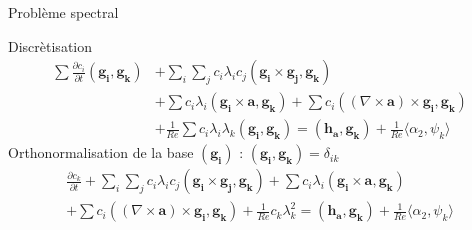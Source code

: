 \documentclass{beamer}
\newcommand{\rot}{{\nabla\times}}
\begin{document}
\begin{frame}{Problème spectral}
\begin{block}{Discrètisation}
\begin{align*}
\sum \frac{\partial c_i}{\partial t}(\mathbf{g_i},\mathbf{g_k}) &+ \sum_i\sum_j c_i\lambda_i c_j(\mathbf{g_i}\times \mathbf{g_j}, \mathbf{g_k}) \\
&+ \sum c_i\lambda_i(\mathbf{g_i}\times \mathbf{a},\mathbf{g_k}) + \sum c_i((\rot \mathbf{a})\times \mathbf{g_i}, \mathbf{g_k}) \\
&+ \frac{1}{Re}\sum c_i\lambda_i\lambda_k(\mathbf{g_i},\mathbf{g_k}) = (\mathbf{h_a},\mathbf{g_k}) + \frac{1}{Re}\langle\alpha_2,\psi_k\rangle
\end{align*}
Orthonormalisation de la base $(\mathbf{g_i})$ : $(\mathbf{g_i},\mathbf{g_k})=\delta_{ik}$
\begin{eqnarray*}
\frac{\partial c_k}{\partial t} + \sum_i\sum_j c_i\lambda_i c_j(\mathbf{g_i}\times \mathbf{g_j}, \mathbf{g_k}) + \sum c_i\lambda_i(\mathbf{g_i}\times \mathbf{a},\mathbf{g_k})\\
+ \sum c_i((\rot \mathbf{a})\times \mathbf{g_i}, \mathbf{g_k}) + \frac{1}{Re}c_k\lambda_k^2 = (\mathbf{h_a},\mathbf{g_k}) + \frac{1}{Re}\langle\alpha_2,\psi_k\rangle
\end{eqnarray*}
\end{block}
\end{frame}
\end{document}
